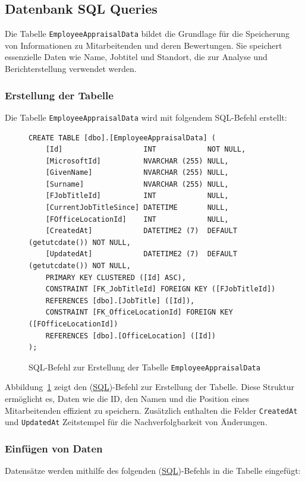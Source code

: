 \subsection{Datenbank SQL Queries}
Die Tabelle \texttt{EmployeeAppraisalData} bildet die Grundlage für die Speicherung von Informationen zu Mitarbeitenden und deren Bewertungen. Sie speichert essenzielle Daten wie Name, Jobtitel und Standort, die zur Analyse und Berichterstellung verwendet werden.

\subsubsection*{Erstellung der Tabelle}
Die Tabelle \texttt{EmployeeAppraisalData} wird mit folgendem SQL-Befehl erstellt:

\begin{figure}[H]
    \centering
    \caption{SQL-Befehl zur Erstellung der Tabelle \texttt{EmployeeAppraisalData}}
    \label{fig:create_table_query}
    \begin{verbatim}
CREATE TABLE [dbo].[EmployeeAppraisalData] (
    [Id]                   INT            NOT NULL,
    [MicrosoftId]          NVARCHAR (255) NULL,
    [GivenName]            NVARCHAR (255) NULL,
    [Surname]              NVARCHAR (255) NULL,
    [FJobTitleId]          INT            NULL,
    [CurrentJobTitleSince] DATETIME       NULL,
    [FOfficeLocationId]    INT            NULL,
    [CreatedAt]            DATETIME2 (7)  DEFAULT (getutcdate()) NOT NULL,
    [UpdatedAt]            DATETIME2 (7)  DEFAULT (getutcdate()) NOT NULL,
    PRIMARY KEY CLUSTERED ([Id] ASC),
    CONSTRAINT [FK_JobTitleId] FOREIGN KEY ([FJobTitleId]) 
    REFERENCES [dbo].[JobTitle] ([Id]),
    CONSTRAINT [FK_OfficeLocationId] FOREIGN KEY ([FOfficeLocationId]) 
    REFERENCES [dbo].[OfficeLocation] ([Id])
);
    \end{verbatim}
\end{figure}

Abbildung~\ref{fig:create_table_query} zeigt den (\hyperref[abkuerzungen]{SQL})-Befehl zur Erstellung der Tabelle. Diese Struktur ermöglicht es, Daten wie die ID, den Namen und die Position eines Mitarbeitenden effizient zu speichern. Zusätzlich enthalten die Felder \texttt{CreatedAt} und \texttt{UpdatedAt} Zeitstempel für die Nachverfolgbarkeit von Änderungen.

\subsubsection*{Einfügen von Daten}
Datensätze werden mithilfe des folgenden (\hyperref[abkuerzungen]{SQL})-Befehls in die Tabelle eingefügt:

